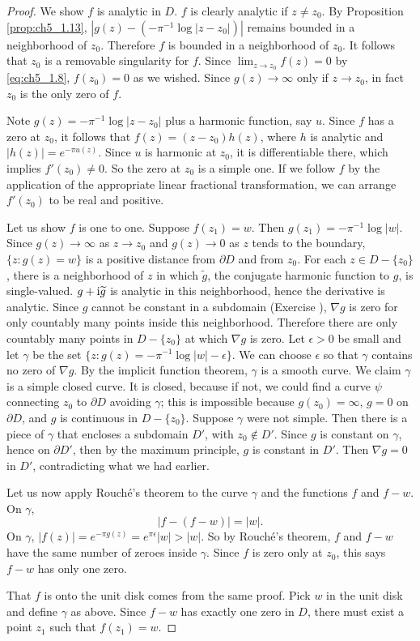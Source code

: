\begin{proof}
We show $f$ is analytic in $D$. $f$ is clearly analytic if $z \neq z_0$. By Proposition \ref{prop:ch5_1.13}, $|g(z) - (-\pi^{-1}\log|z-z_0|)|$ remains bounded in a neighborhood of $z_0$. Therefore $f$ is bounded in a neighborhood of $z_0$. It follows that $z_0$ is a removable singularity for $f$. Since $\lim_{z \to z_0} f(z) = 0$ by \eqref{eq:ch5_1.8}, $f(z_0) = 0$ as we wished. Since $g(z) \to \infty$ only if $z \to z_0$, in fact $z_0$ is the only zero of $f$.

Note $g(z) = -\pi^{-1}\log|z-z_0|$ plus a harmonic function, say $u$. Since $f$ has a zero at $z_0$, it follows that $f(z)=(z-z_0)h(z)$, where $h$ is analytic and $|h(z)|=e^{-\pi u(z)}$. Since $u$ is harmonic at $z_0$, it is differentiable there, which implies $f'(z_0) \neq 0$. So the zero at $z_0$ is a simple one. If we follow $f$ by the application of the appropriate linear fractional transformation, we can arrange $f'(z_0)$ to be real and positive.


Let us show $f$ is one to one. Suppose $f(z_1) = w$. Then $g(z_1) = -\pi^{-1}\log|w|$. Since $g(z) \to \infty$ as $z \to z_0$ and $g(z) \to 0$ as $z$ tends to the boundary, $\{z : g(z) = w\}$ is a positive distance from $\partial D$ and from $z_0$. For each $z \in D-\{z_0\}$, there is a neighborhood of $z$ in which $\widetilde{g}$, the conjugate harmonic function to $g$, is single-valued. $g+\mathrm{i}\widetilde{g}$ is analytic in this neighborhood, hence the derivative is analytic. Since $g$ cannot be constant in a subdomain (Exercise ), $\nabla g$ is zero for only countably many points inside this neighborhood. Therefore there are only countably many points in $D-\{z_0\}$ at which $\nabla g$ is zero. Let $\epsilon > 0$ be small and let $\gamma$ be the set $\{z : g(z) = -\pi^{-1}\log|w|-\epsilon\}$. We can choose $\epsilon$ so that $\gamma$ contains no zero of $\nabla g$. By the implicit function theorem, $\gamma$ is a smooth curve. We claim $\gamma$ is a simple closed curve. It is closed, because if not, we could find a curve $\psi$ connecting $z_0$ to $\partial D$ avoiding $\gamma$; this is impossible because $g(z_0) = \infty$, $g = 0$ on $\partial D$, and $g$ is continuous in $D-\{z_0\}$. Suppose $\gamma$ were not simple. Then there is a piece of $\gamma$ that encloses a subdomain $D'$, with $z_0 \notin D'$. Since $g$ is constant on $\gamma$, hence on $\partial D'$, then by the maximum principle, $g$ is constant in $D'$. Then $\nabla g=0$ in $D'$, contradicting what we had earlier.

Let us now apply Rouch\'e's theorem to the curve $\gamma$ and the functions $f$ and $f-w$. On $\gamma$,
\[
    |f-(f-w)| = |w|.
\]
On $\gamma$, $|f(z)| = e^{-\pi g(z)} = e^{\pi\epsilon}|w| > |w|$. So by Rouch\'e's theorem, $f$ and $f-w$ have the same number of zeroes inside $\gamma$. Since $f$ is zero only at $z_0$, this says $f-w$ has only one zero.

That $f$ is onto the unit disk comes from the same proof. Pick $w$ in the unit disk and define $\gamma$ as above. Since $f-w$ has exactly one zero in $D$, there must exist a point $z_1$ such that $f(z_1) = w$.
\end{proof}

